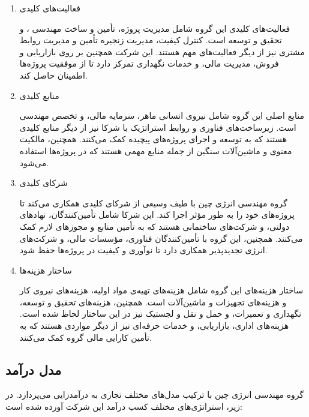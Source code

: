 \documentclass[dvipsnames, svgnames, x11names, 11pt, twocolumn]{article}
\begin{document}
\begin{enumerate}
\item 
فعالیت‌های کلیدی

فعالیت‌های کلیدی این گروه شامل مدیریت پروژه، تأمین و ساخت مهندسی ، و تحقیق و توسعه است. کنترل کیفیت، مدیریت زنجیره تأمین و مدیریت روابط مشتری نیز از دیگر فعالیت‌های مهم هستند. این شرکت همچنین بر روی بازاریابی و فروش، مدیریت مالی، و خدمات نگهداری تمرکز دارد تا از موفقیت پروژه‌ها اطمینان حاصل کند.
\item
منابع کلیدی

منابع اصلی این گروه شامل نیروی انسانی ماهر، سرمایه مالی، و تخصص مهندسی است. زیرساخت‌های فناوری و روابط استراتژیک با شرکا نیز از دیگر منابع کلیدی هستند که به توسعه و اجرای پروژه‌های پیچیده کمک می‌کنند. همچنین، مالکیت معنوی و ماشین‌آلات سنگین از جمله منابع مهمی هستند که در پروژه‌ها استفاده می‌شود.

\item
شرکای کلیدی

گروه مهندسی انرژی چین با طیف وسیعی از شرکای کلیدی همکاری می‌کند تا پروژه‌های خود را به طور مؤثر اجرا کند. این شرکا شامل تأمین‌کنندگان، نهادهای دولتی، و شرکت‌های ساختمانی هستند که به تأمین منابع و مجوزهای لازم کمک می‌کنند. همچنین، این گروه با تأمین‌کنندگان فناوری، مؤسسات مالی، و شرکت‌های انرژی تجدیدپذیر همکاری دارد تا نوآوری و کیفیت در پروژه‌ها حفظ شود.

\item
ساختار هزینه‌ها

ساختار هزینه‌های این گروه شامل هزینه‌های تهیه‌ی مواد اولیه، هزینه‌های نیروی کار و هزینه‌های تجهیزات و ماشین‌آلات است. همچنین، هزینه‌های تحقیق و توسعه، نگهداری و تعمیرات، و حمل و نقل و لجستیک نیز در این ساختار لحاظ شده است. هزینه‌های اداری، بازاریابی، و خدمات حرفه‌ای نیز از دیگر مواردی هستند که به تأمین کارایی مالی گروه کمک می‌کنند.

\end{enumerate}

\subsection{مدل درآمد}
گروه مهندسی انرژی چین با ترکیب مدل‌های مختلف تجاری به درآمدزایی می‌پردازد. در زیر، استراتژی‌های مختلف کسب درآمد این شرکت آورده شده است:
\end{document}
